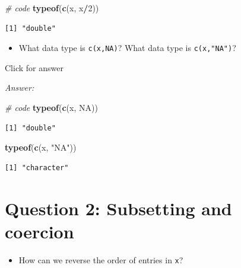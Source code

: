\documentclass[
]{book}
\newenvironment{Shaded}{\begin{snugshade}}{\end{snugshade}}
\newcommand{\CommentTok}[1]{\textcolor[rgb]{0.56,0.35,0.01}{\textit{#1}}}
\newcommand{\ConstantTok}[1]{\textcolor[rgb]{0.56,0.35,0.01}{#1}}
\newcommand{\DecValTok}[1]{\textcolor[rgb]{0.00,0.00,0.81}{#1}}
\newcommand{\FunctionTok}[1]{\textcolor[rgb]{0.13,0.29,0.53}{\textbf{#1}}}
\newcommand{\NormalTok}[1]{#1}
\newcommand{\SpecialCharTok}[1]{\textcolor[rgb]{0.81,0.36,0.00}{\textbf{#1}}}
\newcommand{\StringTok}[1]{\textcolor[rgb]{0.31,0.60,0.02}{#1}}
\providecommand{\tightlist}{%
  \setlength{\itemsep}{0pt}\setlength{\parskip}{0pt}}
\begin{document}
\begin{Shaded}
\begin{Highlighting}[]
\CommentTok{\# code}
\FunctionTok{typeof}\NormalTok{(}\FunctionTok{c}\NormalTok{(x, x}\SpecialCharTok{/}\DecValTok{2}\NormalTok{))}
\end{Highlighting}
\end{Shaded}

\begin{verbatim}
[1] "double"
\end{verbatim}

\begin{itemize}
\tightlist
\item
  What data type is \texttt{c(x,NA)}? What data type is \texttt{c(x,"NA")}?
\end{itemize}

Click for answer

\emph{Answer:}

\begin{Shaded}
\begin{Highlighting}[]
\CommentTok{\# code}
\FunctionTok{typeof}\NormalTok{(}\FunctionTok{c}\NormalTok{(x, }\ConstantTok{NA}\NormalTok{))}
\end{Highlighting}
\end{Shaded}

\begin{verbatim}
[1] "double"
\end{verbatim}

\begin{Shaded}
\begin{Highlighting}[]
\FunctionTok{typeof}\NormalTok{(}\FunctionTok{c}\NormalTok{(x, }\StringTok{"NA"}\NormalTok{))}
\end{Highlighting}
\end{Shaded}

\begin{verbatim}
[1] "character"
\end{verbatim}

\hypertarget{question-2-subsetting-and-coercion}{%
\section{Question 2: Subsetting and coercion}\label{question-2-subsetting-and-coercion}}

\begin{itemize}
\tightlist
\item
  How can we reverse the order of entries in \texttt{x}?
\end{itemize}
\end{document}
